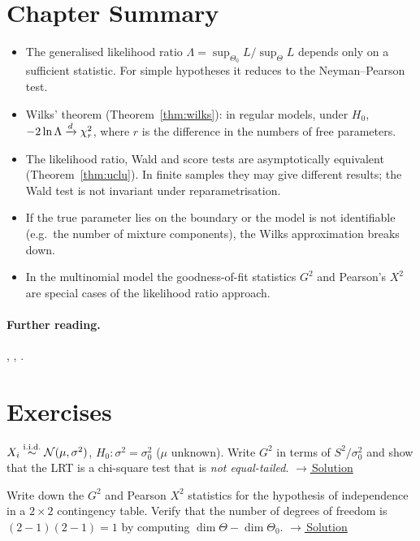 \documentclass[main.tex]{subfiles}
\begin{document}
\section{Chapter Summary}
\begin{summary}
\begin{itemize}
  \item The generalised likelihood ratio $\Lambda=\sup_{\Theta_0}L/\sup_\Theta L$ depends only on a sufficient statistic. For simple hypotheses it reduces to the Neyman--Pearson test.
  \item Wilks' theorem (Theorem~\ref{thm:wilks}): in regular models, under $H_0$, $-2\ln\Lambda\xrightarrow{d}\chi^2_r$, where $r$ is the difference in the numbers of free parameters.
  \item The likelihood ratio, Wald and score tests are asymptotically equivalent (Theorem~\ref{thm:uclu}). In finite samples they may give different results; the Wald test is not invariant under reparametrisation.
  \item If the true parameter lies on the boundary or the model is not identifiable (e.g.\ the number of mixture components), the Wilks approximation breaks down.
  \item In the multinomial model the goodness-of-fit statistics $G^2$ and Pearson's $X^2$ are special cases of the likelihood ratio approach.
\end{itemize}
\end{summary}

\paragraph{Further reading.} \cite[Section~10.3]{casella}, \cite[Chapters~16--17]{vdv}, \cite[Chapter~22]{ferguson}.

\section{Exercises}

\begin{exercise}\label{exr:15-1}
$X_i\overset{\text{i.i.d.}}{\sim}\mathcal{N}(\mu,\sigma^2)$, $H_0:\sigma^2=\sigma_0^2$ ($\mu$ unknown). Write $G^2$ in terms of $S^2/\sigma_0^2$ and show that the LRT is a chi-square test that is \emph{not equal-tailed}.
\hfill\hyperref[coz:15-1]{\footnotesize$\rightarrow$\,Solution}
\end{exercise}

\begin{exercise}\label{exr:15-2}
Write down the $G^2$ and Pearson $X^2$ statistics for the hypothesis of independence in a $2\times2$ contingency table. Verify that the number of degrees of freedom is $(2-1)(2-1)=1$ by computing $\dim\Theta-\dim\Theta_0$.
\hfill\hyperref[coz:15-2]{\footnotesize$\rightarrow$\,Solution}
\end{exercise}
\end{document}

